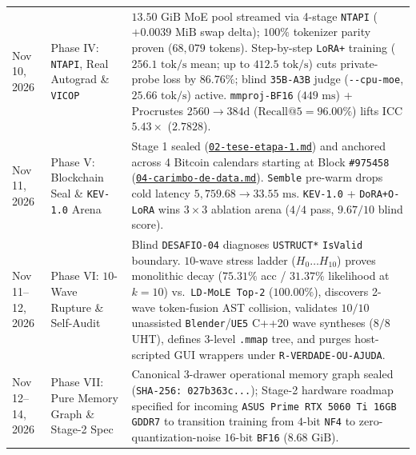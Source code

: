 \documentclass[10pt,a4paper]{article}
\begin{document}
\begin{table}[!htbp]
\begin{tabularx}{\linewidth}{@{}llY@{}}
Nov 10, 2026 & Phase IV: \texttt{NTAPI}, Real Autograd \& \texttt{VICOP} & $13.50\text{ GiB}$ MoE pool streamed via 4-stage \texttt{NTAPI} ($+0.0039\text{ MiB}$ swap delta); $100\%$ tokenizer parity proven ($68,079$ tokens). Step-by-step \texttt{LoRA+} training ($256.1\text{ tok/s}$ mean; up to $412.5\text{ tok/s}$) cuts private-probe loss by $86.76\%$; blind \texttt{35B-A3B} judge (\texttt{-{}-cpu-moe}, $25.66\text{ tok/s}$) active. \texttt{mmproj-BF16} ($449\text{ ms}$) + Procrustes $2560\to 384\text{d}$ ($\text{Recall@5}=96.00\%$) lifts $\mathrm{ICC}$ $5.43\times$ ($2.7828$). \\
Nov 11, 2026 & Phase V: Blockchain Seal \& \texttt{KEV-1.0} Arena & Stage 1 sealed (\href{https://drive.google.com/file/d/1qvnH-nLVMc43T-prWSRTKEDJak89TSp7/view?usp=drivesdk}{\texttt{02-tese-etapa-1.md}}) and anchored across 4 Bitcoin calendars starting at Block \texttt{\#975458} (\href{https://drive.google.com/file/d/1OwjPlXRdBPydtqypoRHNfByfMSmx-Bwb/view?usp=drivesdk}{\texttt{04-carimbo-de-data.md}}). \texttt{Semble} pre-warm drops cold latency $5,759.68\to 33.55\text{ ms}$. \texttt{KEV-1.0} + \texttt{DoRA+O-LoRA} wins $3\times 3$ ablation arena ($4/4$ pass, $9.67/10$ blind score). \\
Nov 11--12, 2026 & Phase VI: $10$-Wave Rupture \& Self-Audit & Blind \texttt{DESAFIO-04} diagnoses \texttt{USTRUCT*} \texttt{IsValid} boundary. $10$-wave stress ladder ($H_0\dots H_{10}$) proves monolithic decay ($75.31\%$ acc / $31.37\%$ likelihood at $k=10$) vs.\ \texttt{LD-MoLE Top-2} ($100.00\%$), discovers 2-wave token-fusion AST collision, validates $10/10$ unassisted \texttt{Blender}/\texttt{UE5} C++20 wave syntheses ($8/8$ UHT), defines 3-level \texttt{.mmap} tree, and purges host-scripted GUI wrappers under \texttt{R-VERDADE-OU-AJUDA}. \\
Nov 12--14, 2026 & Phase VII: Pure Memory Graph \& Stage-2 Spec & Canonical 3-drawer operational memory graph sealed (\texttt{SHA-256: 027b363c...}); Stage-2 hardware roadmap specified for incoming \texttt{ASUS Prime RTX 5060 Ti 16GB GDDR7} to transition training from $4\text{-bit}$ \texttt{NF4} to zero-quantization-noise $16\text{-bit}$ \texttt{BF16} ($8.68\text{ GiB}$). \\
\bottomrule
\end{tabularx}
\end{table}
\end{document}
